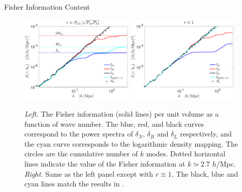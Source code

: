 \begin{section}{Fisher Information Content}
  \begin{figure}
    \includegraphics[width=0.48\textwidth]{fig4a.pdf}
    \includegraphics[width=0.48\textwidth]{fig4b.pdf}
    \centering
    \caption{{\it Left.} The Fisher information (solid lines) per unit volume as
      a function of wave number.  The blue, red, and black curves correspond to the power spectra
      of $\delta_N$, $\delta_R$ and $\delta_L$ respectively,
      and the cyan curve
      corresponds to the logarithmic density mapping. The circles
      are the cumulative number of $k$ modes.  Dotted horizontal lines indicate the value of the 
      Fisher information at $k \simeq 2.7$ $h$/Mpc.  {\it Right.} Same
      as the left panel except with $r\equiv 1$. The black, blue and cyan lines
      match the results in \cite{bib:Rimes2006,bib:Mark2009}.}
  \label{fig:fisherinfo}
\end{figure}
\end{section}
